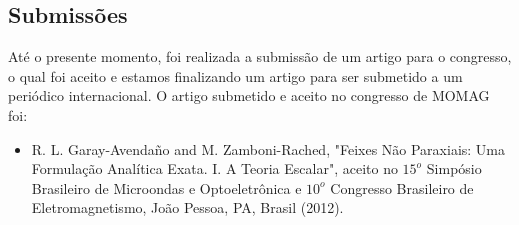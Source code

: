 \subsection*{Submissões}
At\'e o presente momento, foi realizada a submissão de um artigo para o congresso, o qual foi aceito e estamos finalizando um artigo para ser submetido a um periódico internacional. O artigo submetido e aceito no congresso de MOMAG foi:

\begin{itemize}
\item R. L. Garay-Avendaño and M. Zamboni-Rached, "Feixes Não Paraxiais: Uma Formulação Analítica Exata. I. A Teoria Escalar", aceito no $15^{o}$ Simpósio Brasileiro de Microondas e Optoeletrônica e $10^o$ Congresso Brasileiro de Eletromagnetismo, João Pessoa, PA, Brasil (2012).
\end{itemize}  
